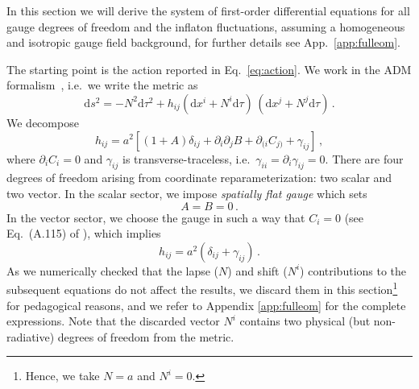 In this section we will derive the system of first-order differential equations for all gauge degrees of freedom and the inflaton fluctuations, assuming a homogeneous and isotropic gauge field background, for further details see App.~\ref{app:fulleom}.

The starting point is the action reported in Eq.~\eqref{eq:action}. We work in the ADM formalism~\cite{Arnowitt:1962hi}, i.e.\ we write the metric as
\begin{equation}
\textrm{d} s^2 = - N^2 \textrm{d} \tau^2 + h_{ij} \left(\textrm{d} x^i + N^i \textrm{d} \tau\right) \, \left(\textrm{d} x^j + N^j \textrm{d} \tau\right) \,.
\end{equation}
We decompose
\begin{equation}
h_{ij} = a^2 \left[\left(1+A\right) \delta_{ij} + \partial_i \partial_j B + \partial_{(i} C_{j)} + \gamma_{ij}\right] \,,
\end{equation}
where $\partial_i C_{i}=0$ and $\gamma_{ij}$ is transverse-traceless, i.e.\ $\gamma_{ii} = \partial_i \gamma_{ij} = 0$. There are four degrees of freedom arising from coordinate reparameterization: two scalar and two vector. In the scalar sector, we impose \textit{spatially flat gauge} which sets
\begin{equation}
A = B = 0 \,.
\end{equation}
In the vector sector, {we choose the gauge in such a way that} $C_i = 0$ (see Eq.~(A.115) of \cite{Baumann:2009ds}), which implies
\begin{equation}
h_{ij} = a^2 \left(\delta_{ij} + \gamma_{ij}\right) \,.
\end{equation}
As we numerically checked that the lapse ($N$) and shift ($N^i$) contributions to the subsequent equations do not affect the results, we discard them in this section\footnote{Hence, we take $N = a$ and $N^i = 0$.} for pedagogical reasons, and we refer to Appendix \ref{app:fulleom} for the complete expressions. 
{Note that the discarded vector $N^i$ contains two physical (but non-radiative) degrees of freedom from the metric.}\\

